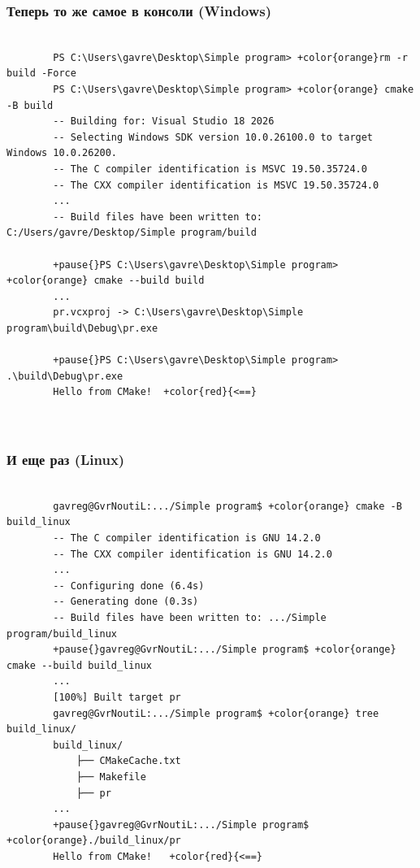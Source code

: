 \documentclass[10pt, aspectratio=1610]{beamer}
\begin{document}
\begin{frame}[fragile]\frametitle{Теперь то же самое в консоли (Windows)}
		
		\begin{Verbatim}[bgcolor=black,tabsize=4,formatcom=\color{white},gobble=2,fontsize=\footnotesize, xleftmargin=0em, frame=single,framerule=0pt ,rulecolor=\color{red},framesep=1em,fillcolor=\color{black},commandchars=+\{\}]
		
		PS C:\Users\gavre\Desktop\Simple program> +color{orange}rm -r build -Force
		PS C:\Users\gavre\Desktop\Simple program> +color{orange} cmake -B build
		-- Building for: Visual Studio 18 2026
		-- Selecting Windows SDK version 10.0.26100.0 to target Windows 10.0.26200.
		-- The C compiler identification is MSVC 19.50.35724.0
		-- The CXX compiler identification is MSVC 19.50.35724.0
		...
		-- Build files have been written to: C:/Users/gavre/Desktop/Simple program/build 
		
		+pause{}PS C:\Users\gavre\Desktop\Simple program> +color{orange} cmake --build build
		...
		pr.vcxproj -> C:\Users\gavre\Desktop\Simple program\build\Debug\pr.exe
		
		+pause{}PS C:\Users\gavre\Desktop\Simple program> .\build\Debug\pr.exe
		Hello from CMake!  +color{red}{<==}

		
	\end{Verbatim}
	
\end{frame}


\begin{frame}[fragile]\frametitle{И еще раз (Linux)}
	
	\begin{Verbatim}[bgcolor=black,tabsize=4,formatcom=\color{white},gobble=2,fontsize=\footnotesize, xleftmargin=0em, frame=single,framerule=0pt ,rulecolor=\color{red},framesep=1em,fillcolor=\color{black},commandchars=+\{\}]
		
		gavreg@GvrNoutiL:.../Simple program$ +color{orange} cmake -B build_linux
		-- The C compiler identification is GNU 14.2.0
		-- The CXX compiler identification is GNU 14.2.0
		...
		-- Configuring done (6.4s)
		-- Generating done (0.3s)
		-- Build files have been written to: .../Simple program/build_linux
		+pause{}gavreg@GvrNoutiL:.../Simple program$ +color{orange} cmake --build build_linux
		...
		[100%] Built target pr
		gavreg@GvrNoutiL:.../Simple program$ +color{orange} tree build_linux/
		build_linux/
			├── CMakeCache.txt
			├── Makefile
			├── pr
		...
		+pause{}gavreg@GvrNoutiL:.../Simple program$ +color{orange}./build_linux/pr
		Hello from CMake!   +color{red}{<==}
		
	\end{Verbatim}
	

	
\end{frame}
\end{document}
